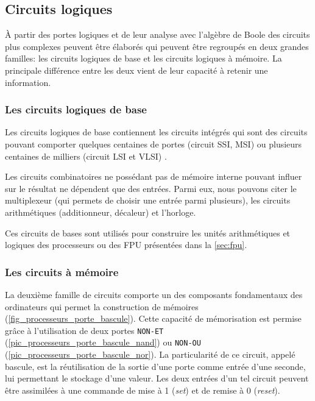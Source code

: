     


\subsection{Circuits logiques}

    À partir des portes logiques et de leur analyse avec l'algèbre de Boole des circuits plus complexes peuvent être élaborés qui peuvent être regroupés en deux grandes familles: les circuits logiques de base  et les circuits logiques à mémoire. La principale différence entre les deux vient de leur capacité à retenir une information. 

    \subsubsection{Les circuits logiques de base}
    
        Les circuits logiques de base contiennent les circuits intégrés qui sont des circuits pouvant comporter quelques centaines de portes (circuit SSI, MSI) ou plusieurs centaines de milliers (circuit LSI et VLSI) \cite{barbe2013very}.
    
        Les circuits combinatoires ne possédant pas de mémoire interne pouvant influer sur le résultat ne dépendent que des entrées. Parmi eux, nous pouvons citer le multiplexeur (qui permets de choisir une entrée parmi plusieurs), les circuits arithmétiques (additionneur, décaleur) et l’horloge. 
        
        Ces circuits de bases sont utilisés pour construire les unités arithmétiques et logiques des processeurs ou des \gls{FPU} présentées dans la \autoref{sec:fpu}.
    
    
    \subsubsection{Les circuits à mémoire}
    
        La deuxième famille de circuits comporte un des composants fondamentaux des ordinateurs qui permet la construction de mémoires (\autoref{fig_processeurs_porte_bascule}). Cette capacité de mémorisation est permise grâce à l'utilisation de deux portes \verb|NON-ET| (\autoref{pic_processeurs_porte_bascule_nand}) ou \verb|NON-OU| (\autoref{pic_processeurs_porte_bascule_nor}). La particularité de ce circuit, appelé bascule, est la réutilisation de la sortie d'une porte comme entrée d'une seconde, lui permettant le stockage d'une valeur. 
        Les deux entrées d'un tel circuit peuvent être assimilées à une commande de mise à 1 (\textit{set}) et de remise à 0 (\textit{reset}).
        
